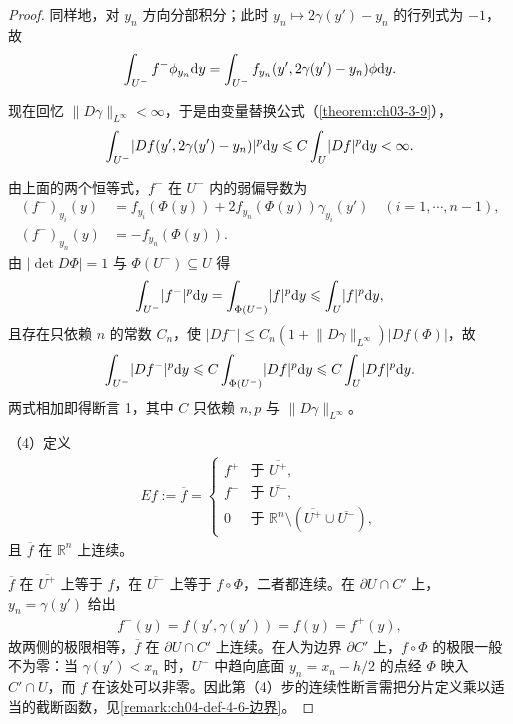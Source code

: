 \documentclass[../../main.tex]{subfiles}%
\begin{document}
\begin{proof}
同样地，对 $y_n$ 方向分部积分；此时 $y_n\mapsto2\gamma(y')-y_n$ 的行列式为 $-1$，故
\begin{align*}
\int_{U^-}f^-\phi_{y_n}\mathrm{d} y=\int_{U^-}f_{y_n}(y',2\gamma(y')-y_n)\phi\mathrm{d} y.
\end{align*}

现在回忆 $\lVert D\gamma\rVert_{L^\infty}<\infty$，于是由变量替换公式（\cref{theorem:ch03-3-9}），%
\begin{align*}
\int_{U^-}\lvert Df(y',2\gamma(y')-y_n)\rvert^p\mathrm{d} y\leqslant C\int_U\lvert Df\rvert^p\mathrm{d} y<\infty.
\end{align*}

由上面的两个恒等式，$f^-$ 在 $U^-$ 内的弱偏导数为
\begin{align*}
(f^-)_{y_i}(y)&=f_{y_i}(\Phi(y))+2f_{y_n}(\Phi(y))\gamma_{y_i}(y')\quad(i=1,\cdots,n-1),\\
(f^-)_{y_n}(y)&=-f_{y_n}(\Phi(y)).
\end{align*}
由 $\lvert\det D\Phi\rvert=1$ 与 $\Phi(U^-)\subseteq U$ 得
\begin{align*}
\int_{U^-}\lvert f^-\rvert^p\mathrm{d} y=\int_{\Phi(U^-)}\lvert f\rvert^p\mathrm{d} y\leqslant\int_U\lvert f\rvert^p\mathrm{d} y,
\end{align*}
且存在只依赖 $n$ 的常数 $C_n$，使 $\lvert Df^-\rvert\leqslant C_n(1+\lVert D\gamma\rVert_{L^\infty})\lvert Df(\Phi)\rvert$，故
\begin{align*}
\int_{U^-}\lvert Df^-\rvert^p\mathrm{d} y\leqslant C\int_{\Phi(U^-)}\lvert Df\rvert^p\mathrm{d} y\leqslant C\int_U\lvert Df\rvert^p\mathrm{d} y.
\end{align*}
两式相加即得断言 1，其中 $C$ 只依赖 $n,p$ 与 $\lVert D\gamma\rVert_{L^\infty}$。

（4）定义
\begin{align*}
Ef:=\overline{f}=
\begin{cases}
f^+ & \text{于 }\overline{U^+},\\
f^- & \text{于 }\overline{U^-},\\
0 & \text{于 }\mathbb{R}^n\setminus(\overline{U^+}\cup\overline{U^-}),
\end{cases}
\end{align*}
且 $\overline{f}$ 在 $\mathbb{R}^n$ 上连续。

$\overline{f}$ 在 $\overline{U^+}$ 上等于 $f$，在 $\overline{U^-}$ 上等于 $f\circ\Phi$，二者都连续。在 $\partial U\cap C'$ 上，$y_n=\gamma(y')$ 给出
\begin{align*}
f^-(y)=f(y',\gamma(y'))=f(y)=f^+(y),
\end{align*}
故两侧的极限相等，$\overline{f}$ 在 $\partial U\cap C'$ 上连续。在人为边界 $\partial C'$ 上，$f\circ\Phi$ 的极限一般不为零：当 $\gamma(y')<x_n$ 时，$U^-$ 中趋向底面 $y_n=x_n-h/2$ 的点经 $\Phi$ 映入 $C'\cap U$，而 $f$ 在该处可以非零。因此第（4）步的连续性断言需把分片定义乘以适当的截断函数，见\cref{remark:ch04-def-4-6-边界}。%


\end{proof}
\end{document}
